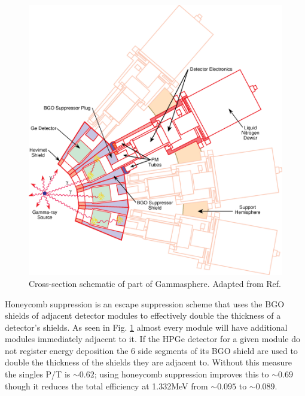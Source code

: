 \begin{figure}[h]
	\centerline{\includegraphics[height=0.3\textheight]{./img/c3/gammasphere_detector.eps}}
	\caption{Cross-section schematic of part of Gammasphere. Adapted from Ref.\cite{gsBooklet}}
	\label{fig:chp3-gs_det_schem}
\end{figure}


Honeycomb suppression is an escape suppression scheme that uses the BGO shields of adjacent detector modules to effectively double the thickness of a detector's shields. As seen in Fig. \ref{fig:chp3-gs_det_schem} almost every module will have additional modules immediately adjacent to it. If the HPGe detector for a given module do not register energy deposition the 6 side segments of its BGO shield are used to double the thickness of the shields they are adjacent to. Without this measure the singles P/T is $\sim0.62$; using honeycomb suppression improves this to $\sim0.69$ though it reduces the total efficiency at 1.332MeV from $\sim0.095$ to $\sim0.089$\cite{TheGS}.

